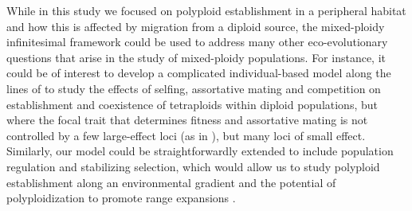 \documentclass[12pt,a4paper]{article}
\begin{document}
While in this study we focused on polyploid establishment in a peripheral
habitat and how this is affected by migration from a diploid source, the
mixed-ploidy infinitesimal framework could be used to address many other
eco-evolutionary questions that arise in the study of mixed-ploidy populations.
For instance, it could be of interest to develop a complicated individual-based
model along the lines of \cite{oswald2011} to study the effects of selfing,
assortative mating and competition on establishment and coexistence of
tetraploids within diploid populations, but where the focal trait that
determines fitness and assortative mating is not controlled by a few
large-effect loci (as in \cite{oswald2011}), but many loci of small effect.
Similarly, our model could be straightforwardly extended to include population
regulation and stabilizing selection, which would allow us to study polyploid
establishment along an environmental gradient and the potential of
polyploidization to promote range expansions \citep{polechova2015}.

%
%
%
%
%



\end{document}
